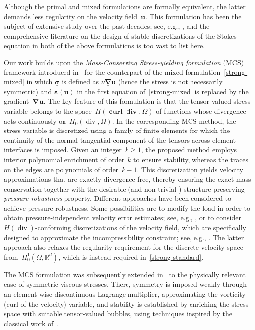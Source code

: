 \documentclass[a4paper,twoside,10pt]{article}
\theoremstyle{plain}
\theoremstyle{remark}
\theoremstyle{definition}
\numberwithin{equation}{section}
\numberwithin{figure}{section}
\newcommand{\Rbbd}{\mathbb{R}^d}
\newcommand{\sigmabf}{\underline{\boldsymbol{\sigma}}}
\newcommand{\ubf}{\mathbf{u}}
\DeclareMathOperator{\dive}{div}
\DeclareMathOperator{\divebf}{\mathbf{div}}
\DeclareMathOperator{\curlbf}{\mathbf{curl}}
\newcommand{\Hcurldivbf}{H(\curlbf\divebf,\Omega)}
\newcommand{\Hzerodiv}{H_0(\dive,\Omega)}
\newcommand{\epsbfun}{\underline{\boldsymbol{\varepsilon}}}
\newcommand{\nablabfun}{\underline{\boldsymbol{\nabla}}}
\begin{document}
Although the primal and mixed formulations are formally equivalent,
the latter demands less regularity on the velocity field~$\ubf$.
This formulation has been the subject of extensive study over the past decades; see, e.g.,
\cite{Farhloul:1995,Farhloul-Fortin:1993,Farhloul-Fortin:1997},
and the comprehensive literature on the design of stable discretizations
of the Stokes equation in both of the above formulations
is too vast to list here.

Our work builds upon
the \emph{Mass-Conserving Stress-yielding formulation} (MCS) framework
introduced in~\cite{Gopalakrishnan-Lederer-Schoberl:2020}
for the counterpart of the mixed formulation~\eqref{strong-mixed}
in which $\sigmabf$ is defined as $\nu\nablabfun\ubf$
(hence the stress is not necessarily symmetric)
and $\epsbfun(\ubf)$ in the first equation of~\eqref{strong-mixed}
is replaced by the gradient~$\nablabfun\ubf$.
The key feature of this formulation is that
the tensor-valued stress variable belongs to the space~$\Hcurldivbf$
of functions whose divergence acts continuously on~$\Hzerodiv$.
In the corresponding MCS method,
the stress variable is discretized using a family of finite elements
for which the continuity of the normal-tangential component of the tensors across element interfaces is imposed.
Given an integer~$k\geq1$,
the proposed method employs interior polynomial enrichment of order~$k$ to ensure stability,
whereas the traces on the edges are polynomials of order~$k-1$.
This discretization yields velocity approximations
that are exactly divergence-free,
thereby ensuring the exact mass conservation
together with the desirable (and non-trivial \cite{Linke:2014})
structure-preserving \emph{pressure-robustness} property.
Different approaches have been considered to achieve pressure-robustness.
Some possibilities are to modify the load in order to obtain
pressure-independent velocity error estimates;
see, e.g., \cite{Lederer-Linke-Merdon:2017,Linke:2012,Linke-Matthies-Tobiska:2016,Brennecke-Linke-Merdon-Schoberl:2015},
or to consider $H(\dive)$-conforming discretizations of the velocity field,
which are specifically designed to approximate the incompressibility constraint;
see, e.g., \cite{Cockburn-Kanschat-Schotzau:2005,Cockburn-Kanschat-Schotzau:2007}.
The latter approach
also relaxes the regularity requirement for the discrete velocity space
from~$H^1_0(\Omega,\Rbbd)$,
which is instead required in~\eqref{strong-standard}.

The MCS formulation was subsequently extended in~\cite{Gopalakrishnan-Lederer-Schoberl:2020-b}
to the physically relevant case of symmetric viscous stresses.
There,
symmetry is imposed weakly through an element-wise discontinuous Lagrange multiplier,
approximating the vorticity (curl of the velocity) variable,
and stability is established by enriching the stress space with suitable tensor-valued bubbles,
using techniques inspired by the classical work of~\cite{Stenberg:1988}.
\end{document}
